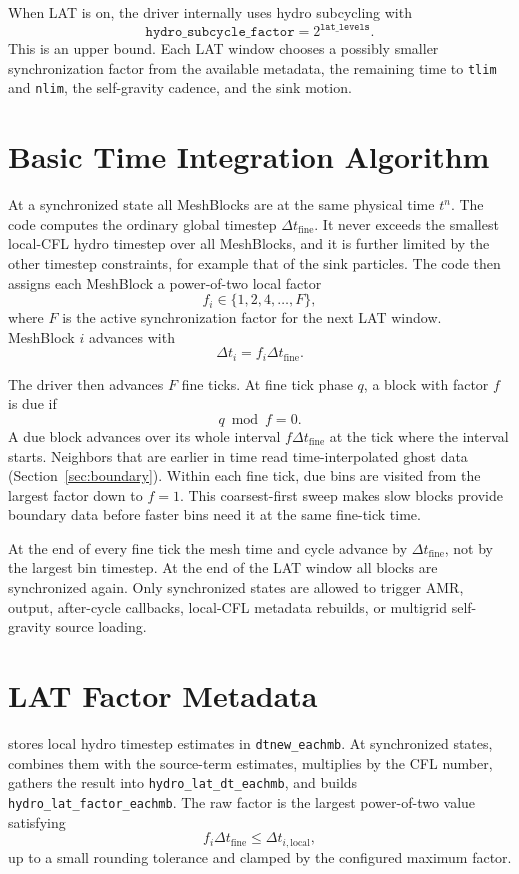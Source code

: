 \documentclass[11pt]{article}
\newcommand{\dt}{\Delta t}
\newcommand{\dtfine}{\Delta t_{\mathrm{fine}}}
\newcommand{\fac}{f}
\begin{document}
When LAT is on, the driver internally uses hydro subcycling with
\[
  \texttt{hydro\_subcycle\_factor} = 2^{\texttt{lat\_levels}} .
\]
This is an upper bound.  Each LAT window chooses a possibly smaller
synchronization factor from the available metadata, the remaining time to
\texttt{tlim} and \texttt{nlim}, the self-gravity cadence, and the sink motion.

\section{Basic Time Integration Algorithm}

At a synchronized state all MeshBlocks are at the same physical time \(t^n\).
The code computes the ordinary global timestep \(\dtfine\).  It never exceeds
the smallest local-CFL hydro timestep over all MeshBlocks, and it is further
limited by the other timestep constraints, for example that of the sink
particles.  The code then assigns each MeshBlock a power-of-two local factor
\[
  \fac_i \in \{1,2,4,\ldots,F\},
\]
where \(F\) is the active synchronization factor for the next LAT window.
MeshBlock \(i\) advances with
\[
  \dt_i = \fac_i \dtfine .
\]

The driver then advances \(F\) fine ticks.  At fine tick phase \(q\), a block
with factor \(\fac\) is due if
\[
  q \bmod \fac = 0 .
\]
A due block advances over its whole interval \(\fac\dtfine\) at the tick where
the interval starts.  Neighbors that are earlier in time read time-interpolated
ghost data (Section~\ref{sec:boundary}).  Within each fine tick, due bins are
visited from the largest factor down to \(\fac=1\).  This coarsest-first sweep
makes slow blocks provide boundary data before faster bins need it at the same
fine-tick time.

At the end of every fine tick the mesh time and cycle advance by
\(\dtfine\), not by the largest bin timestep.  At the end of the LAT window all
blocks are synchronized again.  Only synchronized states are allowed to trigger
AMR, output, after-cycle callbacks, local-CFL metadata rebuilds, or multigrid
self-gravity source loading.

\section{LAT Factor Metadata}

 stores local hydro timestep estimates in
\texttt{dtnew\_eachmb}.  At synchronized states,
 combines them with the source-term
estimates, multiplies by the CFL number, gathers the result into
\texttt{hydro\_lat\_dt\_eachmb}, and builds
\texttt{hydro\_lat\_factor\_eachmb}.  The raw factor is the largest
power-of-two value satisfying
\[
  \fac_i \dtfine \leq \dt_{i,\mathrm{local}},
\]
up to a small rounding tolerance and clamped by the configured maximum factor.
\end{document}
